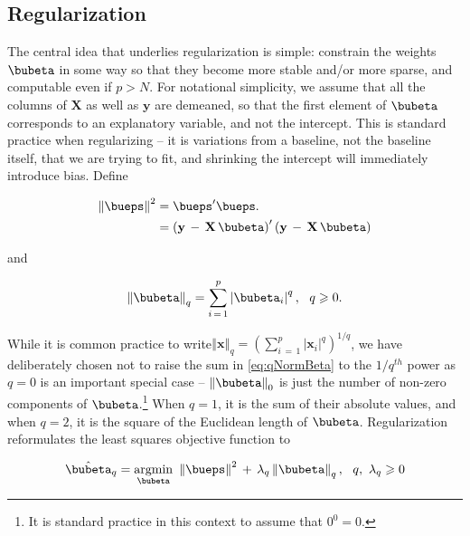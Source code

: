\documentclass[graybox,envcountchap,sectrefs]{svmono}\usepackage[]{graphicx}\usepackage[]{xcolor}
\begin{document}
\begin{appendices}
\subsection{Regularization}

The central idea that underlies regularization is simple: constrain
the weights $\bubeta$ in some way so that they become more stable
and/or more sparse, and computable even if $p>N$. For notational
simplicity, we assume that all the columns of $\mathrm{\mathbf{X}}$
as well as $\mathrm{\mathbf{y}}$ are demeaned, so that the first
element of $\bubeta$ corresponds to an explanatory variable, and
not the intercept. This is standard practice when regularizing --
it is variations from a baseline, not the baseline itself, that we
are trying to fit, and shrinking the intercept will immediately introduce
bias. Define

\begin{align}
\left\Vert \bueps\right\Vert ^{2} & =\bueps^{\prime}\bueps.\nonumber \\
 & =\left(\mathrm{\mathbf{y}}\,-\,\mathrm{\mathbf{X}}\,\bubeta\right)^{\prime}\left(\mathrm{\mathbf{y}}\,-\,\mathrm{\mathbf{X}}\,\bubeta\right)\label{eq:SumEpsilonSquared}
\end{align}

and

\begin{equation}
\left\Vert \bubeta\right\Vert _{q}=\sum_{i\,=\,1}^{p}\left|\bubeta_{i}\right|^{q},\ \ q\geqslant0.\label{eq:qNormBeta}
\end{equation}

While it is common practice to write$\left\Vert \mathbf{x}\right\Vert _{q}=\left(\sum_{i\,=\,1}^{p}\left|\mathbf{x}_{i}\right|^{q}\right)^{1/q}$,
we have deliberately chosen not to raise the sum in \eqref{eq:qNormBeta}
to the $1/q^{th}$ power as $q=0$ is an important special case --
$\left\Vert \bubeta\right\Vert _{0}$ is just the number of non-zero
components of $\bubeta$.\footnote{It is standard practice in this context to assume that $0^{0}=0$.}
When $q=1$, it is the sum of their absolute values, and when $q=2$,
it is the square of the Euclidean length of $\bubeta$. Regularization
reformulates the least squares objective function to

\begin{equation}
\hat{\bubeta}_{q}=\underset{\bubeta}{\mathrm{argmin}}\ \left\Vert \bueps\right\Vert ^{2}\,+\,\lambda_{q}\left\Vert \bubeta\right\Vert _{q},\ \ q,\ \lambda_{q}\geqslant0\label{eq:RegularizationGeneral}
\end{equation}


\end{appendices}
\end{document}
